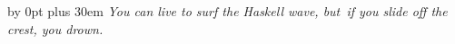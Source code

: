 \documentclass[preprint,nonatbib,blockstyle,times]{sigplanconf}
\newcommand\mrfy{MRFy} %
\begin{document}
\iffinaldraft


\vfill

\begingroup
\parfillskip=0pt
\advance\leftskip by 0pt plus 30em
\emph{You can live to surf the Haskell wave, but~if you slide off the crest, you
drown.}
\par
\endgroup

\fi


% 
% 
\end{document}
